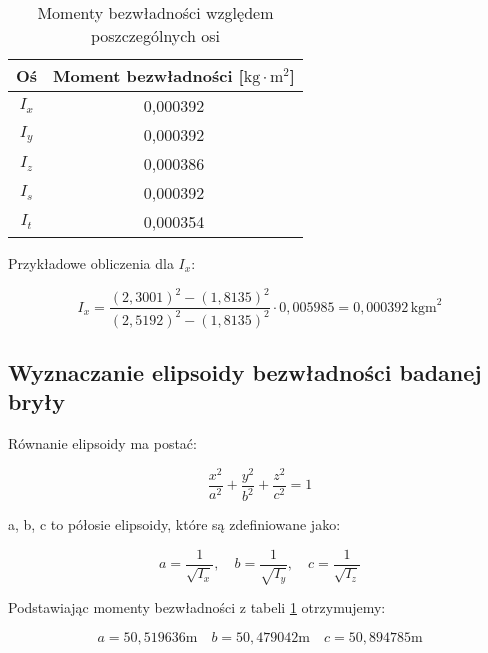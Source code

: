 \documentclass[a4paper,12pt]{article}
\begin{document}
\begin{table}[H]
    \centering
    \begin{tabular}{|c|c|}
        \hline
        Oś & Moment bezwładności [$\text{kg}\cdot\text{m}^2$] \\
        \hline
        $I_x$ & 0,000392 \\
        $I_y$ & 0,000392 \\
        $I_z$ & 0,000386 \\
        $I_s$ & 0,000392 \\
        $I_t$ & 0,000354 \\
        \hline
    \end{tabular}
    \caption{Momenty bezwładności względem poszczególnych osi}
    \label{tab:momenty_bezwladnosci}
\end{table}

Przykładowe obliczenia dla $I_x$:

\begin{equation*}
    I_x = \frac{(2,3001)^2 - (1,8135)^2}{(2,5192)^2 - (1,8135)^2} \cdot 0,005985 = 0,000392\,\text{kgm}^2
\end{equation*}



\subsection{Wyznaczanie elipsoidy bezwładności badanej bryły}


Równanie elipsoidy ma postać:

\begin{equation*}
    \frac{x^2}{a^2} + \frac{y^2}{b^2} + \frac{z^2}{c^2} = 1
\end{equation*}

a, b, c to półosie elipsoidy, które są zdefiniowane jako:

\begin{equation*}
    a = \frac{1}{\sqrt{I_x}}, \quad
    b = \frac{1}{\sqrt{I_y}}, \quad
    c = \frac{1}{\sqrt{I_z}}
\end{equation*}

Podstawiając momenty bezwładności z tabeli \ref{tab:momenty_bezwladnosci} otrzymujemy:

\begin{equation*}
    a=50,519636 \text{m} \quad
    b=50,479042 \text{m} \quad
    c=50,894785 \text{m}
\end{equation*}
\end{document}
